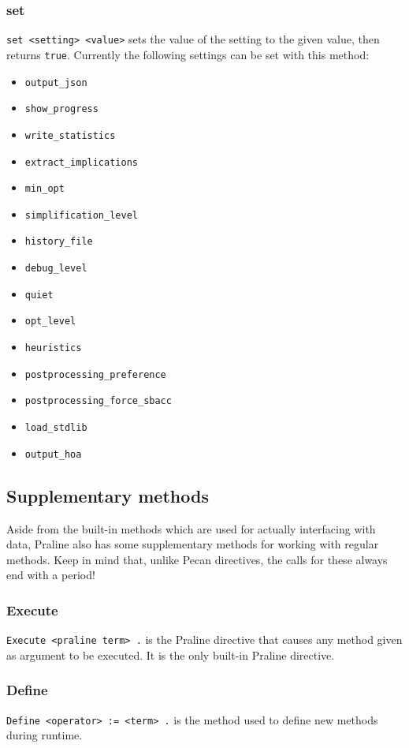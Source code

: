 \documentclass{report}
\begin{document}
\subsubsection{set}
\verb+set <setting> <value>+ sets the value of the setting to the given value, then returns \verb+true+.
Currently the following settings can be set with this method:
\begin{itemize}
    \item \verb+output_json+
    \item \verb+show_progress+
    \item \verb+write_statistics+
    \item \verb+extract_implications+
    \item \verb+min_opt+
    \item \verb+simplification_level+
    \item \verb+history_file+
    \item \verb+debug_level+
    \item \verb+quiet+
    \item \verb+opt_level+
    \item \verb+heuristics+
    \item \verb+postprocessing_preference+
    \item \verb+postprocessing_force_sbacc+
    \item \verb+load_stdlib+
    \item \verb+output_hoa+
\end{itemize}


\subsection{Supplementary methods}
Aside from the built-in methods which are used for actually interfacing with data, Praline also has some supplementary methods for working with regular methods.
Keep in mind that, unlike Pecan directives, the calls for these always end with a period!

\subsubsection{Execute}
\verb+Execute <praline term> .+ is the Praline directive that causes any method given as argument to be executed.
It is the only built-in Praline directive.

\subsubsection{Define}
\verb+Define <operator> := <term> .+ is the method used to define new methods during runtime.
\end{document}
